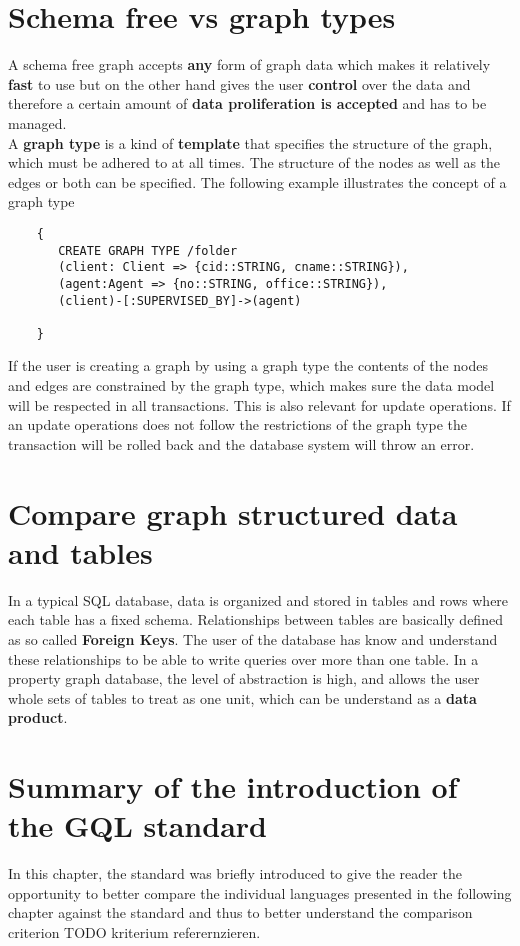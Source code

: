 \section{Schema free vs graph types}
\label{sec:iso:schema_free_vs_graph_types}
A schema free graph accepts \textbf{any} form of graph data which makes it relatively \textbf{fast} to use 
but on the other hand gives the user \textbf{control} over the data 
and therefore a certain amount of \textbf{data proliferation is accepted} and has to be managed.\\
A \textbf{graph type} is a kind of \textbf{template} that specifies the structure of the graph, which must be adhered to at all times.
The structure of the nodes as well as the edges or both can be specified.
The following example illustrates the concept of a graph type
\begin{lstlisting}
    {
       CREATE GRAPH TYPE /folder
       (client: Client => {cid::STRING, cname::STRING}),
       (agent:Agent => {no::STRING, office::STRING}),
       (client)-[:SUPERVISED_BY]->(agent)

    }
\end{lstlisting}
If the user is creating a graph by using a graph type the contents of the nodes and edges 
are constrained by the graph type, which makes sure the data model will be respected in 
all transactions. This is also relevant for update operations. If an update operations does 
not follow the restrictions of the graph type the transaction will be rolled back and 
the database system will throw an error.

\section{Compare graph structured data and tables}
\label{sec:iso:compare_graph_structured_data_and_tables}
In a typical SQL database, data is organized and stored in tables and rows where each 
table has a fixed schema.\newline
Relationships between tables are basically defined as so called \textbf{Foreign Keys}.
The user of the database has know and understand these relationships to be able
to write queries over more than one table.\newline
In a property graph database, the level of abstraction is high, and allows the user 
whole sets of tables to treat as one unit, which can be understand as a \textbf{data product}.

\section{Summary of the introduction of the GQL standard}
\label{sec:iso:summary_of_the_introduction_of_the_gql_standard}
In this chapter, the standard was briefly introduced to give the reader the opportunity to better compare 
the individual languages presented in the following chapter against the standard 
and thus to better understand the comparison criterion TODO kriterium referernzieren.

